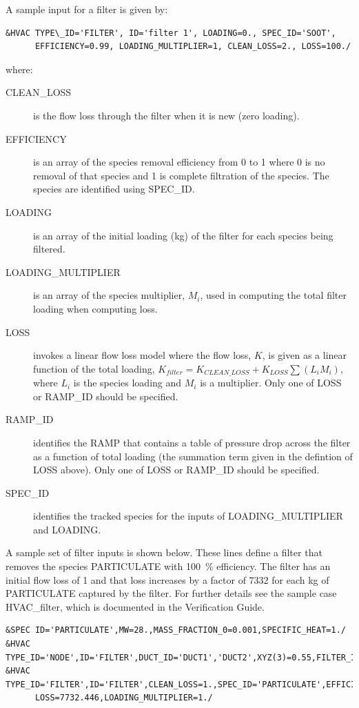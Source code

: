 \documentclass[11pt]{book}
\begin{document}
A sample input for a filter is given by:
\begin{lstlisting}
&HVAC TYPE\_ID='FILTER', ID='filter 1', LOADING=0., SPEC_ID='SOOT',
      EFFICIENCY=0.99, LOADING_MULTIPLIER=1, CLEAN_LOSS=2., LOSS=100./
\end{lstlisting}
where:
\begin{description}
\item[{\ct CLEAN\_LOSS}] is the flow loss through the filter when it is new (zero loading).
\item[{\ct EFFICIENCY}] is an array of the species removal efficiency from 0 to 1 where 0 is no removal of that species and 1 is complete filtration of the species.  The species are identified using {\ct SPEC\_ID}.
\item[{\ct LOADING}] is an array of the initial loading (kg) of the filter for each species being filtered.
\item[{\ct LOADING\_MULTIPLIER}] is an array of the species multiplier, $M_i$, used in computing the total filter loading when computing loss.
\item[{\ct LOSS}] invokes a linear flow loss model where the flow loss, $K$, is given as a linear function of the total loading, $K_{filter}=K_{CLEAN\_LOSS}+K_{LOSS} \sum \left( L_i M_i \right)$, where $L_i$ is the species loading and $M_i$ is a multiplier.  Only one of {\ct LOSS} or {\ct RAMP\_ID} should be specified.
\item[{\ct RAMP\_ID}] identifies the {\ct RAMP} that contains a table of pressure drop across the filter as a function of total loading (the summation term given in the defintion of {\ct LOSS} above).   Only one of {\ct LOSS} or {\ct RAMP\_ID} should be specified.
\item[{\ct SPEC\_ID}] identifies the tracked species for the inputs of {\ct LOADING\_MULTIPLIER} and {\ct LOADING}.
\end{description}
A sample set of filter inputs is shown below.  These lines define a filter that removes the species {\ct PARTICULATE} with 100~\% efficiency.  The filter has an initial flow loss of 1 and that loss increases by a factor of 7332 for each kg of {\ct PARTICULATE} captured by the filter.  For further details see the sample case {\ct HVAC\_filter}, which is documented in the Verification Guide.

\begin{lstlisting}
&SPEC ID='PARTICULATE',MW=28.,MASS_FRACTION_0=0.001,SPECIFIC_HEAT=1./
&HVAC TYPE_ID='NODE',ID='FILTER',DUCT_ID='DUCT1','DUCT2',XYZ(3)=0.55,FILTER_ID='FILTER'/
&HVAC TYPE_ID='FILTER',ID='FILTER',CLEAN_LOSS=1.,SPEC_ID='PARTICULATE',EFFICIENCY=1.,
      LOSS=7732.446,LOADING_MULTIPLIER=1./
\end{lstlisting}
\end{document}
